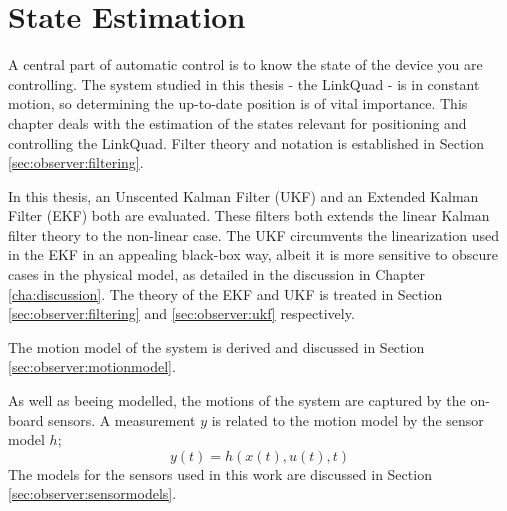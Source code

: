 \chapter{State Estimation}
\label{cha:observer}
    A central part of automatic control is to know the state of the device you are
    controlling. The system studied in this thesis - the LinkQuad - is in constant
    motion, so determining the up-to-date position is of vital importance.
    This chapter deals with the estimation of the states relevant for positioning
    and controlling the LinkQuad.
    Filter theory and notation is established in Section \ref{sec:observer:filtering}.

    In this thesis, an Unscented Kalman Filter (UKF) and an Extended Kalman Filter (EKF) both are evaluated.
    These filters both extends the linear Kalman filter theory to the non-linear case.
    The UKF circumvents the linearization used in the EKF in an appealing black-box way,
    albeit it is more sensitive to obscure cases in the physical model,
    as detailed in the discussion in Chapter \ref{cha:discussion}.
    The theory of the EKF and UKF is treated in
    Section \ref{sec:observer:filtering} and \ref{sec:observer:ukf} respectively.

    The motion model of the system is derived and discussed in Section \ref{sec:observer:motionmodel}.

    As well as beeing modelled, the motions of the system are captured by the on-board sensors.
    A measurement $y$ is related to the motion model by the sensor model $h$;
    \begin{equation}
        y(t) = h(x(t),u(t),t)
    \end{equation}
    The models for the sensors used in this work are discussed in Section \ref{sec:observer:sensormodels}.

    
    
    
    
